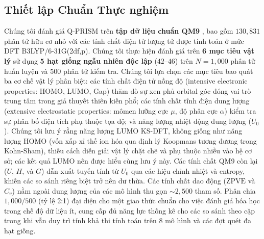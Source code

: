 \documentclass[10pt,twocolumn,letterpaper]{article}
\begin{document}
\subsection{Thiết lập Chuẩn Thực nghiệm}

Chúng tôi đánh giá Q-PRISM trên \textbf{tập dữ liệu chuẩn QM9} \cite{ramakrishnan2014quantum}, bao gồm $130{,}831$ phân tử hữu cơ nhỏ với các tính chất điện tử lượng tử được tính toán ở mức DFT B3LYP/6-31G(2df,p).
Chúng tôi thực hiện đánh giá trên \textbf{6 mục tiêu vật lý} sử dụng \textbf{5 hạt giống ngẫu nhiên độc lập} ($42$--$46$) trên $N = 1{,}000$ phân tử huấn luyện và $500$ phân tử kiểm tra.
Chúng tôi lựa chọn các mục tiêu bao quát ba cơ chế vật lý phân biệt: các tính chất điện tử nồng độ (intensive electronic properties: HOMO, LUMO, Gap) thăm dò sự xen phủ orbital góc đóng vai trò trung tâm trong giả thuyết thiên kiến phổ; các tính chất tĩnh điện dung lượng (extensive electrostatic properties: mômen lưỡng cực $\mu$, độ phân cực $\alpha$) kiểm tra sự phân bố điện tích phụ thuộc tọa độ; và năng lượng nhiệt động dung lượng ($U_0$). Chúng tôi lưu ý rằng năng lượng LUMO KS-DFT, không giống như năng lượng HOMO (vốn xấp xỉ thế ion hóa qua định lý Koopmans tương đương trong Kohn-Sham), thiếu cách diễn giải vật lý chặt chẽ và phụ thuộc nhiều vào hệ cơ sở; các kết quả LUMO nên được hiểu cùng lưu ý này. Các tính chất QM9 còn lại ($U$, $H$, và $G$) dẫn xuất tuyến tính từ $U_0$ qua các hiệu chỉnh nhiệt và entropy, khiến các so sánh riêng biệt trở nên dư thừa. Các tính chất dao động ($\text{ZPVE}$ và $C_v$) nằm ngoài dung lượng của các mô hình thu gọn $\sim 2{,}500$ tham số.
Phân chia $1{,}000 / 500$ (tỷ lệ 2:1) đại diện cho một giao thức chuẩn cho việc đánh giá hóa học trong chế độ dữ liệu ít, cung cấp đủ năng lực thống kê cho các so sánh theo cặp trong khi vẫn duy trì tính khả thi tính toán trên 8 mô hình và các đợt quét đa hạt giống.
\end{document}
